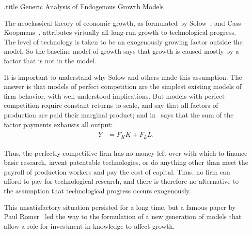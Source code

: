\documentclass{handout}
\begin{document}
\renewcommand{\cite}{\citeyearpar}


\handoutHeader

\begin{verbatimwrite}{\jobname.title}
Generic Analysis of Endogenous Growth Models
\end{verbatimwrite}

\handoutNameMake

The neoclassical theory of economic growth, as formulated
by Solow~\cite{solow:contribution}, and Cass~\cite{cass:growth}-Koopmans~\cite{koopmans:growth}, attributes virtually all long-run growth to technological
progress.  The level of technology is taken to be an exogenously
growing factor outside the model.  So the baseline model of growth
says that growth is caused mostly by a factor that is not in the model.

It is important to understand why Solow and others made this
assumption. The answer is that models of perfect competition
are the simplest existing models of firm behavior, with
well-understood implications.  But models with perfect competition require
constant returns to scale, and say that all factors of production are
paid their marginal product; and \EulersTheorem in \MathFactsList  ~says that the sum of the factor payments
exhausts all output:
\begin{equation}\begin{gathered}\begin{aligned}
  \label{eq:EulersTheorem}
  Y & =  F_K K + F_L L.
\end{aligned}\end{gathered}\end{equation}

Thus, the perfectly competitive firm has no money left over with which
to finance basic research, invent patentable technologies, or do anything
other than meet the payroll of production workers and pay the cost of
capital.  Thus, no firm can afford to pay for technological research,
and there is therefore no alternative to the assumption that
technological progress occurs exogenously.

This unsatisfactory situation persisted for a long time, but a famous
paper by Paul Romer~\cite{romer:growth} led the way to the formulation
of a new generation of models that allow a role for investment in
knowledge to affect growth.
\end{document}

